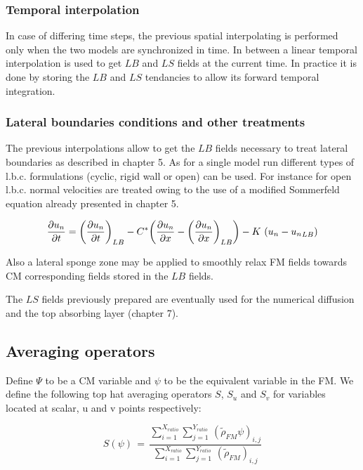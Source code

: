 \subsubsection{Temporal interpolation}

 In case of differing time steps, the previous spatial interpolating is
performed only when the two models are synchronized in time. In between
a linear temporal interpolation is used to get $LB$ and $LS$ fields at the
current time.
In practice it is done by storing the $LB$ and $LS$ tendancies to allow its
forward temporal integration.

\subsubsection{Lateral boundaries conditions and other treatments}

 The previous interpolations allow to get the $LB$ fields necessary to
treat lateral boundaries as described in chapter 5. As for a single model
run different types of l.b.c. formulations (cyclic, rigid wall or open) can
be used. For instance for open l.b.c. normal velocities are treated owing
to the use of a modified Sommerfeld equation already presented in chapter 5.

\begin{equation}
\label{carpenter2}
{\partial u_n \over \partial t} =             {\left({{\partial u_n \over \partial t}}\right)}_{LB}
- C^*{\left(  {\partial u_n \over \partial x}  -  {\left({{\partial u_n \over \partial x}}\right)}_{LB}  \right)}
- K \, \, {\left( u_n - {u_n}_{LB}   \right)}
\end{equation}

 Also a lateral sponge zone may be applied to smoothly relax FM
fields towards CM corresponding fields stored in the $LB$ fields.

 The $LS$ fields previously prepared are eventually used for the numerical
diffusion and the top absorbing layer (chapter 7).

\subsection{Averaging operators}

 Define $\Psi$ to be a CM variable and $\psi$ to be the equivalent
variable in the FM. We define the following top hat averaging operators
$S$, $S_u$ and $S_v$ for variables located at scalar, u and v points
respectively:

\begin{equation}
\label{averaging-op}
 S ( \psi) \, = \, \dfrac{
 \sum_{i=1}^{X_{ratio}} \sum_{j=1}^{Y_{ratio}} \,
\left( \tilde{\rho}_{FM} \psi \right)_{i,j}          }
{
 \sum_{i=1}^{X_{ratio}} \sum_{j=1}^{Y_{ratio}} \,
\left( \tilde{\rho}_{FM} \right)_{i,j}               }
\end{equation}


